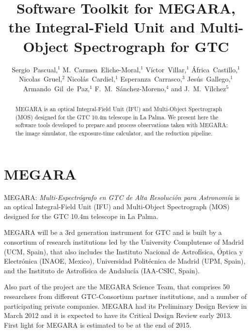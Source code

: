 
\resetcounters


\title{Software Toolkit for MEGARA, the Integral-Field Unit and Multi-Object Spectrograph
for GTC}
\author{Sergio~Pascual,$^1$ M.~Carmen~Eliche-Moral,$^1$ 
V\'ictor~Villar,$^1$ \'Africa~Castillo,$^1$ Nicolas~Gruel,$^2$ 
Nicol\'as~Cardiel,$^1$ Esperanza~Carrasco,$^3$ Jes\'us~Gallego,$^1$ 
Armando~Gil~de~Paz,$^1$ F.~M.~S\'anchez-Moreno,$^4$
and J.~M.~V\'ilchez$^5$
}


\begin{abstract}
MEGARA is an optical Integral-Field Unit (IFU) and Multi-Object Spectrograph (MOS) designed for the GTC 10.4m telescope in La Palma. We present here the software tools developed to prepare and process observations taken with MEGARA: the image simulator, the exposure-time calculator, and the reduction pipeline.
\end{abstract}

\section{MEGARA}
MEGARA: \emph{Multi-Espectr\'ografo en GTC de Alta Resoluci\'on para Astronom\'ia}  is an optical Integral-Field Unit (IFU) and Multi-Object Spectrograph (MOS) designed for the GTC 10.4m telescope in La Palma.

MEGARA will be a 3rd generation instrument for GTC and is built by a consortium of research institutions led by the University Complutense of Madrid (UCM, Spain), that also includes the Instituto Nacional de Astrof\'isica, \'Optica y Electr\'onica (INAOE, Mexico), Universidad Polit\'ecnica de Madrid (UPM, Spain), and the Instituto de Astrof\'isica de Andaluc\'ia  (IAA-CSIC, Spain).

Also part of the project are the MEGARA Science Team, that comprises 50 researchers from different GTC-Consortium partner institutions, and a number of participating private companies.  MEGARA had its Preliminary Design Review in March 2012 and it is expected to have its Critical Design Review early 2013. First light for MEGARA is estimated to be at the end of 2015.

